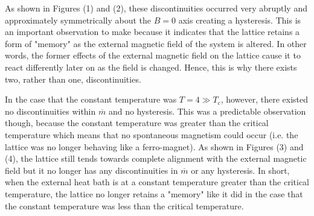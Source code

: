 \documentclass[twocolumn]{article}
\begin{document}
As shown in Figures (1) and (2), these discontinuities occurred very abruptly and approximately symmetrically about the $B=0$ axis creating a hysteresis. This is an important observation to make because it indicates that the lattice retains a form of "memory" as the external magnetic field of the system is altered. In other words, the former effects of the external magnetic field on the lattice cause it to react differently later on as the field is changed. Hence, this is why there exists two, rather than one, discontinuities. 

In the case that the constant temperature was $T=4 \gg T_c$, however, there existed no discontinuities within $\overline{m}$ and no hysteresis. This was a predictable observation though, because the constant temperature was greater than the critical temperature which means that no spontaneous magnetism could occur (i.e. the lattice was no longer behaving like a ferro-magnet). As shown in Figures (3) and (4), the lattice still tends towards complete alignment with the external magnetic field but it no longer has any discontinuities in $\overline{m}$ or any hysteresis. In short, when the external heat bath is at a constant temperature greater than the critical temperature, the lattice no longer retains a "memory" like it did in the case that the constant temperature was less than the critical temperature. 
\end{document}

